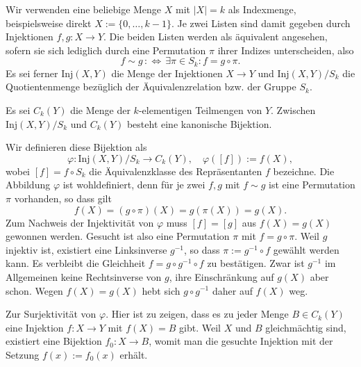 Wir verwenden eine beliebige Menge $X$ mit $|X|=k$ als Indexmenge,
beispielsweise direkt $X:=\{0,\ldots,k-1\}$. Je zwei Listen sind damit
gegeben durch Injektionen $f,g\colon X\to Y$. Die beiden Listen werden
als äquivalent angesehen, sofern sie sich lediglich durch eine
Permutation $\pi$ ihrer Indizes unterscheiden, also
\[f\sim g\,:\Leftrightarrow\,\exists\pi\in S_k\colon f = g\circ\pi.\]
Es sei ferner $\mathrm{Inj}(X,Y)$ die Menge der Injektionen $X\to Y$
und $\mathrm{Inj}(X,Y)/S_k$ die Quotientenmenge bezüglich der
Äquivalenzrelation bzw. der Gruppe $S_k$.
\begin{Satz}\label{Bij-Inj-Teilmengen}
Es sei $C_k(Y)$ die Menge der $k$-elementigen Teilmengen von $Y$.
Zwischen $\mathrm{Inj}(X,Y)/S_k$ und $C_k(Y)$ besteht eine
kanonische Bijektion.
\end{Satz}
\begin{Beweis}
Wir definieren diese Bijektion als
\[\varphi\colon\mathrm{Inj}(X,Y)/S_k\to C_k(Y),\quad\varphi([f]) := f(X),\]
wobei $[f]=f\circ S_k$ die Äquivalenzklasse des Repräsentanten $f$
bezeichne. Die Abbildung $\varphi$ ist wohldefiniert, denn für je zwei $f,g$
mit $f\sim g$ ist eine Permutation $\pi$ vorhanden, so dass gilt
\[f(X) = (g\circ\pi)(X) = g(\pi(X)) = g(X).\]
Zum Nachweis der Injektivität von $\varphi$ muss $[f]=[g]$ aus
$f(X)=g(X)$ gewonnen werden. Gesucht ist also eine Permutation
$\pi$ mit $f=g\circ\pi$. Weil $g$ injektiv ist, existiert eine
Linksinverse $g^{-1}$, so dass $\pi := g^{-1}\circ f$ gewählt werden
kann. Es verbleibt die Gleichheit $f = g\circ g^{-1}\circ f$ zu
bestätigen. Zwar ist $g^{-1}$ im Allgemeinen keine Rechtsinverse von $g$,
ihre Einschränkung auf $g(X)$ aber schon. Wegen $f(X)=g(X)$ hebt sich
$g\circ g^{-1}$ daher auf $f(X)$ weg.

Zur Surjektivität von $\varphi$. Hier ist zu zeigen, dass es zu jeder
Menge $B\in C_k(Y)$ eine Injektion $f\colon X\to Y$ mit $f(X)=B$ gibt.
Weil $X$ und $B$ gleichmächtig sind, existiert eine Bijektion $f_0\colon X\to B$,
womit man die gesuchte Injektion mit der Setzung $f(x):=f_0(x)$ erhält.\,\qedsymbol
\end{Beweis}

